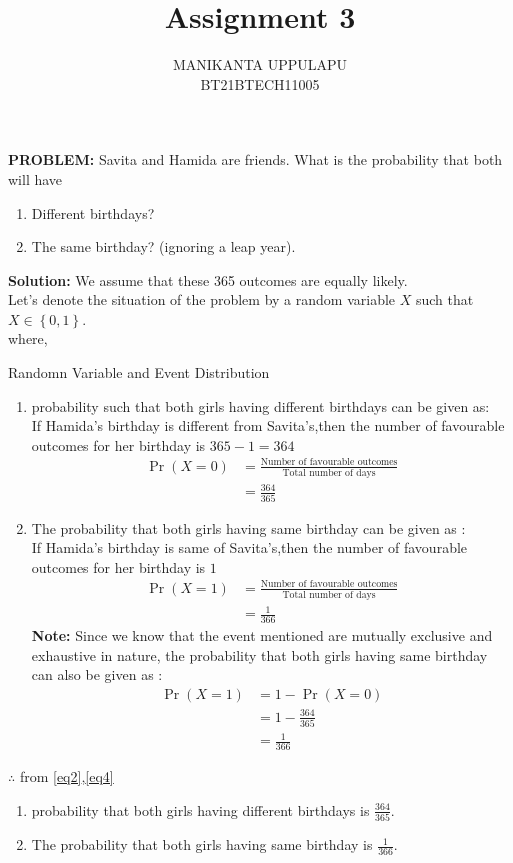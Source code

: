 \documentclass[journal,12pt,twocolumn]{IEEEtran}
\title{Assignment 3}
\author{MANIKANTA UPPULAPU\\BT21BTECH11005}
\date{}
\providecommand{\pr}[1]{\ensuremath{\Pr\left(#1\right)}}
\providecommand{\cbrak}[1]{\ensuremath{\left\{#1\right\}}}
\newcommand{\PROBLEM}{\noindent \textbf{PROBLEM: }}
\newcommand{\solution}{\noindent \textbf{Solution: }}
\newcommand{\note}{\noindent \textbf{Note: }}
\begin{document}
\maketitle
\PROBLEM Savita and Hamida are friends. What is the probability that both will have 
\begin{enumerate}[label=(\roman{enumi})]
	\item Different birthdays?
	\item The same birthday? (ignoring a leap year).
\end{enumerate}

\solution We assume that these 365 outcomes are equally likely.\\

Let's denote the situation of the problem by a random variable $X$ such that $X\in \cbrak{0,1}$. \\
where,\\
\begin{table}[H]

	\caption{Randomn Variable and Event Distribution}
	\label{tab : TABLE I}
\end{table}
\begin{enumerate}[label=(\roman{enumi})]
\item probability such that both girls having different birthdays can be given as: \\

If Hamida's birthday is different from Savita's,then the number of favourable outcomes for her birthday is $365-1 =364$
\begin{align}
	 \pr{X=0} &= \frac{\text{Number of favourable outcomes}}{\text{Total number of days}}\label{eq1}\\
	&=\frac{364}{365}\label{eq2}
\end{align}
\item The probability that both girls having same birthday can be given as :\\

If Hamida's birthday is same of Savita's,then the number of favourable outcomes for her birthday is $1$
\begin{align}
	 \pr{X=1}&=\frac{\text{Number of favourable outcomes}}{\text{Total number of days}}\label{eq3}\\
	&=\frac{1}{366}\label{eq4}
\end{align}
\note Since we know that the event mentioned are mutually exclusive and exhaustive in nature, the probability that both girls having same birthday can also be given as :
\begin{align}
	\pr{X=1}&=1-\pr{X=0}\label{eq5}\\
	&=1-\frac{364}{365}\label{eq6}\\
	&=\frac{1}{366}\label{eq7}
\end{align}
\end{enumerate}
$\therefore$ from \eqref{eq2},\eqref{eq4}\\
\begin{enumerate}[label=(\roman{enumi})]
\item probability that both girls having different birthdays is $\frac{364}{365}$.\\

\item The probability that both girls having same birthday is $\frac{1}{366}$.
\end{enumerate}
\end{document}
